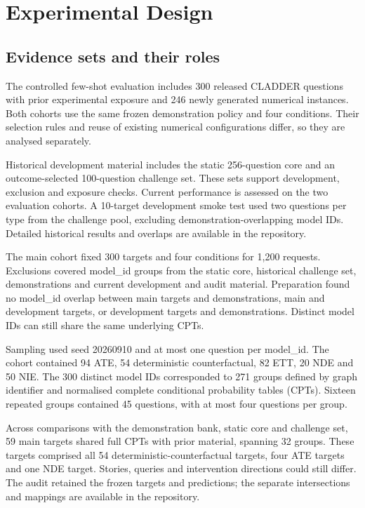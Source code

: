 \chapter{Experimental Design}\label{ch:4}

\section{Evidence sets and their roles}\label{sec:4.1}

The controlled few-shot evaluation includes 300 released CLADDER questions with prior experimental exposure and 246 newly generated numerical instances. Both cohorts use the same frozen demonstration policy and four conditions. Their selection rules and reuse of existing numerical configurations differ, so they are analysed separately.

Historical development material includes the static 256-question core and an outcome-selected 100-question challenge set. These sets support development, exclusion and exposure checks. Current performance is assessed on the two evaluation cohorts. A 10-target development smoke test used two questions per type from the challenge pool, excluding demonstration-overlapping model IDs. Detailed historical results and overlaps are available in the repository.

The main cohort fixed 300 targets and four conditions for 1,200 requests. Exclusions covered model\_id groups from the static core, historical challenge set, demonstrations and current development and audit material. Preparation found no model\_id overlap between main targets and demonstrations, main and development targets, or development targets and demonstrations. Distinct model IDs can still share the same underlying CPTs.

Sampling used seed 20260910 and at most one question per model\_id. The cohort contained 94 ATE, 54 deterministic counterfactual, 82 ETT, 20 NDE and 50 NIE. The 300 distinct model IDs corresponded to 271 groups defined by graph identifier and normalised complete conditional probability tables (CPTs). Sixteen repeated groups contained 45 questions, with at most four questions per group.

Across comparisons with the demonstration bank, static core and challenge set, 59 main targets shared full CPTs with prior material, spanning 32 groups. These targets comprised all 54 deterministic-counterfactual targets, four ATE targets and one NDE target. Stories, queries and intervention directions could still differ. The audit retained the frozen targets and predictions; the separate intersections and mappings are available in the repository.

